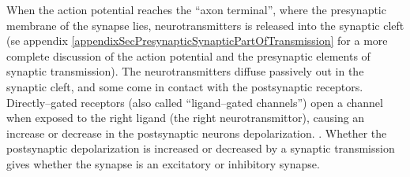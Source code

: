 When the action potential reaches the ``axon terminal'', where the presynaptic membrane of the synapse lies, neurotransmitters is released into the synaptic cleft 
 	(se appendix \ref{appendixSecPresynapticSynapticPartOfTransmission} for a more complete discussion of the action potential and the presynaptic elements of synaptic transmission).
The neurotransmitters diffuse passively out in the synaptic cleft, and some come in contact with the postsynaptic receptors.
Directly--gated receptors (also called ``ligand--gated channels'') open a channel when exposed to the right ligand (the right neurotransmittor), causing an increase or decrease in the postsynaptic neurons depolarization\cite{PrinciplesOfNeuralScience4edKAP10}. .
Whether the postsynaptic depolarization is increased or decreased by a synaptic transmission gives whether the synapse is an excitatory or inhibitory synapse\cite{PurvesNeuroscienceKAP05}.





